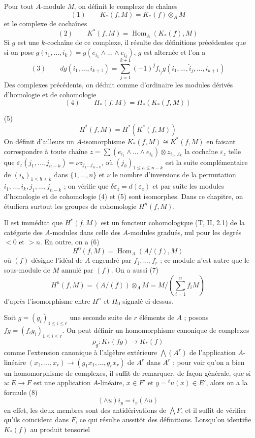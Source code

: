 Pour tout $A$-module $M$, on définit le complexe de chaînes
$$(1) \qquad K_*(f, M) = K_*(f) \otimes_A M$$
et le complexe de cochaînes
$$(2) \qquad K^*(f, M) = \operatorname{Hom}_A(K_*(f), M)$$
Si $g$ est une $k$-cochaîne de ce complexe, il résulte des définitions précédentes que si on pose $g(i_1, \dots, i_k) = g(e_{i_1} \wedge \dots \wedge e_{i_k})$, $g$ est alternée et l'on a
$$(3) \qquad dg(i_1, \dots, i_{k+1}) = \sum_{j=1}^{k+1} (-1)^j f_{i_j} g(i_1, \dots, \hat{i}_j, \dots, i_{k+1})$$
Des complexes précédents, on déduit comme d'ordinaire les modules dérivés d'homologie et de cohomologie
$$(4) \qquad H_*(f, M) = H_*(K_*(f, M))$$

\newpage


(5) $$ H^*(f, M) = H^*(K^*(f, M)) $$
On définit d'ailleurs un $A$-isomorphisme $K_*(f, M) \cong K^*(f, M)$ en faisant correspondre à toute chaîne $z = \sum (e_{i_1} \wedge \dots \wedge e_{i_k}) \otimes z_{i_1 \dots i_k}$ la cochaîne $\varepsilon_z$ telle que $\varepsilon_z(j_1, \dots, j_{n-k}) = \nu z_{j_1 \dots j_{n-k}}$, où $(j_h)_{1 \le h \le n-k}$ est la suite complémentaire de $(i_h)_{1 \le h \le k}$ dans $\{1, \dots, n\}$ et $\nu$ le nombre d'inversions de la permutation $i_1, \dots, i_k, j_1, \dots, j_{n-k}$ ; on vérifie que $\delta \varepsilon_z = d(\varepsilon_z)$ et par suite les modules d'homologie et de cohomologie (4) et (5) sont isomorphes. Dans ce chapitre, on étudiera surtout les groupes de cohomologie $H^n(f, M)$.

Il est immédiat que $H^*(f, M)$ est un foncteur cohomologique (T, II, 2.1) de la catégorie des $A$-modules dans celle des $A$-modules gradués, nul pour les degrés $< 0$ et $> n$. En outre, on a
(6) $$ H^0(f, M) = \operatorname{Hom}_A(A/(f), M) $$
où $(f)$ désigne l'idéal de $A$ engendré par $f_1, \dots, f_r$ ; ce module n'est autre que le sous-module de $M$ annulé par $(f)$. On a aussi
(7) $$ H^n(f, M) = (A/(f)) \otimes_A M = M / (\sum_{i=1}^n f_i M) $$
d'après l'isomorphisme entre $H^n$ et $H_0$ signalé ci-dessus.

Soit $g = (g_i)_{1 \le i \le r}$ une seconde suite de $r$ éléments de $A$ ; posons $fg = (f_i g_i)_{1 \le i \le r}$. On peut définir un homomorphisme canonique de complexes
$$ \rho_g : K_*(fg) \to K_*(f) $$
comme l'extension canonique à l'algèbre extérieure $\bigwedge(A^r)$ de l'application $A$-linéaire $(x_1, \dots, x_r) \to (g_1 x_1, \dots, g_r x_r)$ de $A^r$ dans $A^r$ ; pour voir qu'on a bien un homomorphisme de complexes, il suffit de remarquer, de façon générale, que si $u: E \to F$ est une application $A$-linéaire, $x \in F'$ et $y = {}^t u(x) \in E'$, alors on a la formule
(8) $$ (\wedge u) i_y = i_x (\wedge u) $$
en effet, les deux membres sont des antidérivations de $\bigwedge F$, et il suffit de vérifier qu'ils coïncident dans $F$, ce qui résulte aussitôt des définitions. Lorsqu'on identifie $K_*(f)$ au produit tensoriel

